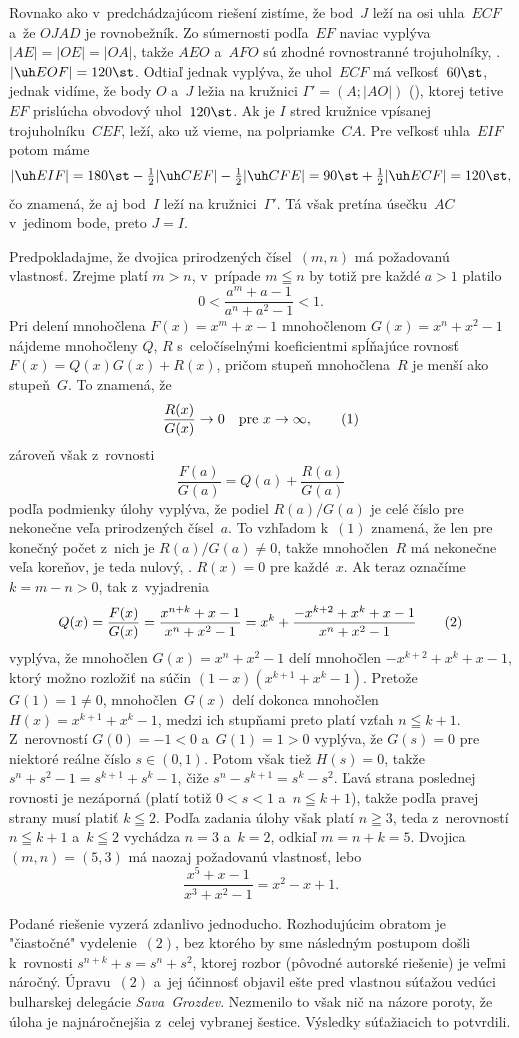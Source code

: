 {\ineriesenie
Rovnako ako v~predchádzajúcom riešení zistíme, že bod~$J$ leží na osi
uhla~$ECF$ a~že $OJAD$ je rovnobežník. Zo súmernosti podľa~$EF$
naviac vyplýva $|AE|=|OE|=|OA|$, takže $AEO$ a~$AFO$ sú zhodné
rovnostranné trojuholníky, \tj. $|\uh EOF|=120\st$. Odtiaľ jednak vyplýva, že
uhol~$ECF$ má veľkosť~$60\st$, jednak vidíme, že body
$O$ a~$J$ ležia na kružnici $\Gamma'=(A;|AO|)$ (\obr), ktorej tetive~$EF$
\inspicture{}
prislúcha obvodový uhol~$120\st$. Ak je $I$ stred kružnice
vpísanej trojuholníku~$CEF$, leží, ako už vieme, na polpriamke~$CA$. Pre
veľkosť uhla~$EIF$ potom máme
$$
|\uh EIF|=180\st-\tfrac12|\uh CEF|-\tfrac12|\uh CFE|=
          90\st+\tfrac12|\uh ECF|=120\st,
$$
čo znamená, že aj bod~$I$ leží na kružnici~$\Gamma'$. Tá však
pretína úsečku~$AC$ v~jedinom bode, preto $J=I$.}

{%
Predpokladajme, že dvojica prirodzených čísel~$(m,n)$
má požadovanú vlastnosť.
Zrejme platí $m>n$, v~prípade $m\leqq n$ by totiž pre každé $a>1$
platilo
$$
0<\frac{a^m+a-1}{a^n+a^2-1}<1.
$$
Pri delení mnohočlena $F(x)=x^m+x-1$ mnohočlenom $G(x)=x^n+x^2-1$
nájdeme mnohočleny $Q$, $R$ s~celočíselnými koeficientmi
spĺňajúce rovnosť $F(x)=Q(x)G(x)+R(x)$, pričom stupeň mnohočlena~$R$
je menší ako stupeň~$G$. To znamená, že
$$
{R(x)\over G(x)}\to0 \quad\text{pre $x\to\infty$},        \tag1
$$
zároveň však z~rovnosti
$$
\frac{F(a)}{G(a)}=Q(a)+\frac{R(a)}{G(a)}
$$
podľa podmienky úlohy vyplýva, že podiel $R(a)/G(a)$ je celé číslo
pre nekonečne veľa prirodzených čísel~$a$. To vzhľadom k~$(1)$
znamená, že len pre konečný počet z~nich je $R(a)/G(a)\ne0$,
takže mnohočlen~$R$ má nekonečne veľa koreňov, je teda nulový, \tj. $R(x)=0$
pre každé~$x$. Ak teraz označíme $k=m-n>0$, tak
z~vyjadrenia
$$
Q(x)=\frac{F(x)}{G(x)}=\frac{x^{n+k}+x-1}{x^n+x^2-1}=
x^k+\frac{-x^{k+2}+x^k+x-1}{x^n+x^2-1}             \tag2
$$
vyplýva, že mnohočlen $G(x)=x^n+x^2-1$ delí mnohočlen
${-x}^{k+2}+x^k+x-1$, ktorý možno rozložiť na súčin
$(1-x)(x^{k+1}+x^k-1)$. Pretože $G(1)=1\ne0$, mnohočlen~$G(x)$ delí
dokonca mnohočlen $H(x)=x^{k+1}+x^k-1$, medzi ich stupňami preto
platí vzťah $n\leqq k+1$. Z~nerovností $G(0)={-1}<0$
a~$G(1)=1>0$ vyplýva, že $G(s)=0$ pre niektoré reálne číslo
$s\in(0,1)$. Potom však tiež
$H(s)=0$, takže $s^n+s^2-1=s^{k+1}+s^k-1$,
čiže $s^n-s^{k+1}=s^k-s^2$. Ľavá strana poslednej rovnosti je
nezáporná (platí totiž $0<s<1$ a~$n\leqq k+1$), takže podľa pravej
strany musí platiť $k\leqq2$. Podľa zadania úlohy však platí
$n\geqq3$, teda z~nerovností $n\leqq k+1$ a~$k\leqq2$ vychádza
$n=3$ a~$k=2$, odkiaľ $m=n+k=5$. Dvojica $(m,n)=(5,3)$ má
naozaj požadovanú vlastnosť, lebo
$$
\frac{x^5+x-1}{x^3+x^2-1}=x^2-x+1.
$$

\poznamka
Podané riešenie vyzerá zdanlivo jednoducho.
Rozhodujúcim obratom je "čiastočné" vydelenie~$(2)$, bez ktorého by sme
následným postupom došli k~rovnosti $s^{n+k}+s=s^n+s^2$, ktorej
rozbor (pôvodné autorské riešenie) je veľmi
náročný. Úpravu~$(2)$ a~jej účinnosť objavil ešte pred
vlastnou súťažou vedúci bulharskej delegácie {\it Sava~Grozdev\/}.
Nezmenilo to však nič na názore poroty, že úloha je najnáročnejšia
z~celej vybranej šestice. Výsledky súťažiacich to potvrdili.}

